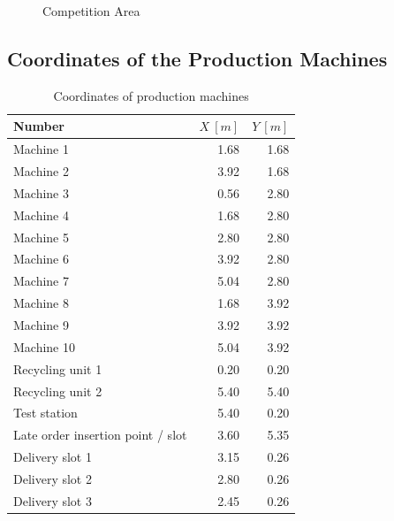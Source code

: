 \documentclass[12pt,twoside]{article}
\begin{document}
\begin{figure}[h]
  \caption{Competition Area}
  \label{fig:competition-area}
\end{figure}



\subsection{Coordinates of the Production Machines}
\label{sec:coordinates}

\begin{table}[h]
  \centering
  \begin{tabular}{l|r|r}
    \multicolumn{1}{l}{Number} & \multicolumn{1}{l}{$X~[m]$} & \multicolumn{1}{l}{$Y~[m]$}\\ \hline
    Machine 1 & 1.68 & 1.68 \\
    Machine 2 & 3.92 & 1.68 \\
    Machine 3 & 0.56 & 2.80 \\
    Machine 4 & 1.68 & 2.80 \\
    Machine 5 & 2.80 & 2.80 \\
    Machine 6 & 3.92 & 2.80 \\
    Machine 7 & 5.04 & 2.80 \\
    Machine 8 & 1.68 & 3.92 \\
    Machine 9 & 3.92 & 3.92 \\
    Machine 10 & 5.04 & 3.92 \\
    Recycling unit 1 & 0.20 & 0.20 \\
    Recycling unit 2 & 5.40 & 5.40 \\
    Test station &	5.40  &0.20 \\
    Late order insertion point / slot & 	3.60 & 	5.35 \\
    Delivery slot 1 & 	3.15 & 0.26 \\
    Delivery slot 2 &	2.80 & 0.26 \\ 
    Delivery slot 3 &	2.45 & 0.26 \\\hline
  \end{tabular}

  \caption{Coordinates of production machines}
  \label{tab:coordinates}
\end{table}
\end{document}
